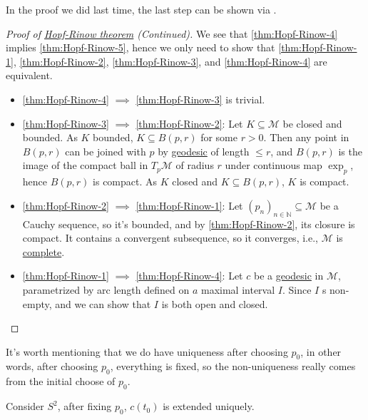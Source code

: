 In the proof we did last time, the last step can be shown via \cite[Corollary 3.9]{flaherty2013riemannian}.

\begin{proof}[Proof of \hyperlink{thm:Hopf-Rinow}{Hopf-Rinow theorem} (Continued)]
	We see that \autoref{thm:Hopf-Rinow-4} implies \autoref{thm:Hopf-Rinow-5}, hence we only need to show that \autoref{thm:Hopf-Rinow-1}, \autoref{thm:Hopf-Rinow-2}, \autoref{thm:Hopf-Rinow-3}, and \autoref{thm:Hopf-Rinow-4} are equivalent.
	\begin{itemize}
		\item \autoref{thm:Hopf-Rinow-4} \(\implies \) \autoref{thm:Hopf-Rinow-3} is trivial.
		\item \autoref{thm:Hopf-Rinow-3} \(\implies \) \autoref{thm:Hopf-Rinow-2}: Let \(K \subseteq \mathcal{M} \) be closed and bounded. As \(K\) bounded, \(K \subseteq B(p, r)\) for some \(r > 0\). Then any point in \(B(p, r)\) can be joined with \(p\) by \hyperref[def:geodesic]{geodesic} of length \(\leq r\), and \(B(p, r)\) is the image of the compact ball in \(T_p \mathcal{M} \) of radius \(r\) under continuous map \(\exp _p\), hence \(B(p, r)\) is compact. As \(K\) closed and \(K \subseteq B(p, r)\), \(K\) is compact.
		\item \autoref{thm:Hopf-Rinow-2} \(\implies \) \autoref{thm:Hopf-Rinow-1}: Let \((p_n)_{n \in \mathbb{N} } \subseteq \mathcal{M} \) be a Cauchy sequence, so it's bounded, and by \autoref{thm:Hopf-Rinow-2}, its closure is compact. It contains a convergent subsequence, so it converges, i.e., \(\mathcal{M} \) is \hyperref[def:geodesically-complete]{complete}.
		\item \autoref{thm:Hopf-Rinow-1} \(\implies \) \autoref{thm:Hopf-Rinow-4}: Let \(c\) be a \hyperref[def:geodesic]{geodesic} in \(\mathcal{M} \), parametrized by arc length defined on \(a\) maximal interval \(I\). Since \(I\) s non-empty, and we can show that \(I\) is both open and closed.
	\end{itemize}
\end{proof}

It's worth mentioning that we do have uniqueness after choosing \(p_0\), in other words, after choosing \(p_0\), everything is fixed, so the non-uniqueness really comes from the initial choose of \(p_0\).

\begin{eg}
	Consider \(S^2\), after fixing \(p_0\), \(c(t_0)\) is extended uniquely.
	\begin{center}
	\end{center}
\end{eg}

